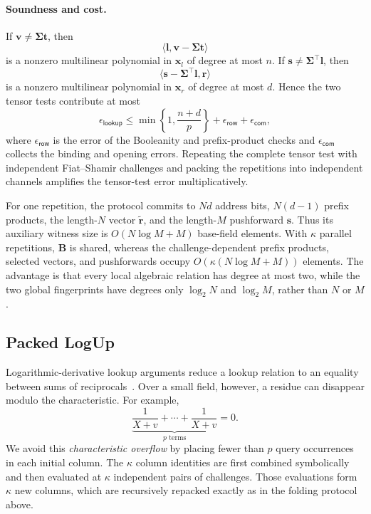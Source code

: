 \documentclass[runningheads]{llncs}
\begin{document}
\paragraph{Soundness and cost.}
If \(\bm v\ne\bm\Sigma\bm t\), then
\[
    \langle\bm l,\bm v-\bm\Sigma\bm t\rangle
\]
is a nonzero multilinear polynomial in \(\bm x_l\) of degree at most
\(n\).  If \(\bm s\ne\bm\Sigma^\top\bm l\), then
\[
    \langle
      \bm s-\bm\Sigma^\top\bm l,
      \bm r
    \rangle
\]
is a nonzero multilinear polynomial in \(\bm x_r\) of degree at most
\(d\).  Hence the two tensor tests contribute at most
\begin{equation}
    \epsilon_{\mathsf{lookup}}
      \leq
      \min\left\{1,\frac{n+d}{p}\right\}
      +\epsilon_{\mathsf{row}}
      +\epsilon_{\mathsf{com}},
\label{eq:small-field-lookup-soundness}
\end{equation}
where \(\epsilon_{\mathsf{row}}\) is the error of the Booleanity and
prefix-product checks and \(\epsilon_{\mathsf{com}}\) collects the
binding and opening errors.  Repeating the complete tensor test with
independent Fiat--Shamir challenges and packing the repetitions into
independent channels amplifies the tensor-test error multiplicatively.

For one repetition, the protocol commits to \(Nd\) address bits,
\(N(d-1)\) prefix products, the length-\(N\) vector
\(\widetilde{\bm r}\), and the length-\(M\) pushforward \(\bm s\).
Thus its auxiliary witness size is \(O(N\log M+M)\) base-field
elements.  With \(\kappa\) parallel repetitions, \(\bm B\) is shared,
whereas the challenge-dependent prefix products, selected vectors, and
pushforwards occupy \(O(\kappa(N\log M+M))\) elements.  The advantage
is that every local algebraic relation has degree at most two, while
the two global fingerprints have degrees only \(\log_2N\) and
\(\log_2M\), rather than \(N\) or \(M\).

\subsection{Packed LogUp}
\label{sec:packed-logup}

Logarithmic-derivative lookup arguments reduce a lookup relation to an
equality between sums of reciprocals~\cite{iacr/Habock22a}.  Over a
small field, however, a residue can disappear modulo the
characteristic.  For example,
\[
    \underbrace{\frac{1}{X+v}+\cdots+\frac{1}{X+v}}
      _{p\text{ terms}}
    =0.
\]
We avoid this \emph{characteristic overflow} by placing fewer than
\(p\) query occurrences in each initial column.  The \(\kappa\) column
identities are first combined symbolically and then evaluated at
\(\kappa\) independent pairs of challenges.  Those evaluations form
\(\kappa\) new columns, which are recursively repacked exactly as in
the folding protocol above.
\end{document}
